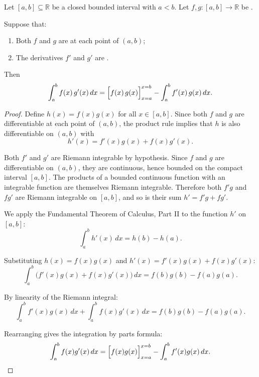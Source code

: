 \begin{theorem} \label{theorem:integration_by_parts_for_riemann_integrals_on_closed_intervals}
    Let $[a, b] \subseteq \mathbb{R}$ be a closed bounded interval with $a < b$. Let $f, g : [a, b] \to \mathbb{R}$ be .

    Suppose that:
    \begin{enumerate}
        \item Both $f$ and $g$ are  at each point of $(a, b)$;
        \item The derivatives $f'$ and $g'$ are .
    \end{enumerate}
    Then
    $$\int_a^b f(x)\,g'(x)\,dx = \Bigl[f(x)\,g(x)\Bigr]_{x=a}^{x=b} - \int_a^b f'(x)\,g(x)\,dx.$$
\end{theorem}
\begin{proof}
    Define $h(x) = f(x)g(x)$ for all $x \in [a, b]$. Since both $f$ and $g$ are differentiable at each point of $(a, b)$, the product rule implies that $h$ is also differentiable on $(a, b)$ with
    $$h'(x) = f'(x)g(x) + f(x)g'(x).$$

    Both $f'$ and $g'$ are Riemann integrable by hypothesis. Since $f$ and $g$ are differentiable on $(a, b)$, they are continuous, hence bounded on the compact interval $[a, b]$. The products of a bounded continuous function with an integrable function are themselves Riemann integrable. Therefore both $f'g$ and $fg'$ are Riemann integrable on $[a, b]$, and so is their sum $h' = f'g + fg'$.

    We apply the Fundamental Theorem of Calculus, Part II to the function $h'$ on $[a, b]$:
    $$\int_a^b h'(x)\,dx = h(b) - h(a).$$

    Substituting $h(x) = f(x)g(x)$ and $h'(x) = f'(x)g(x) + f(x)g'(x)$:
    $$\int_a^b \bigl(f'(x)g(x) + f(x)g'(x)\bigr)\,dx = f(b)g(b) - f(a)g(a).$$

    By linearity of the Riemann integral:
    $$\int_a^b f'(x)g(x)\,dx + \int_a^b f(x)g'(x)\,dx = f(b)g(b) - f(a)g(a).$$

    Rearranging gives the integration by parts formula:
    $$\int_a^b f(x)g'(x)\,dx = \Bigl[f(x)g(x)\Bigr]_{x=a}^{x=b} - \int_a^b f'(x)g(x)\,dx.$$
\end{proof}
